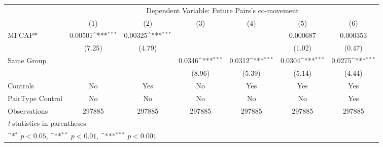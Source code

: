 {
\def\sym#1{\ifmmode^{#1}\else\(^{#1}\)\fi}
\begin{tabular}{l*{6}{c}}
\hline\hline
                &\multicolumn{6}{c}{Dependent Variable:  Future Pairs's co-movement}                                              \\\cmidrule(lr){2-7}
                &\multicolumn{1}{c}{(1)}         &\multicolumn{1}{c}{(2)}         &\multicolumn{1}{c}{(3)}         &\multicolumn{1}{c}{(4)}         &\multicolumn{1}{c}{(5)}         &\multicolumn{1}{c}{(6)}         \\
\hline
$ \text{MFCAP*} $&  0.00501\sym{***}&  0.00325\sym{***}&                  &                  & 0.000687         & 0.000353         \\
                &   (7.25)         &   (4.79)         &                  &                  &   (1.02)         &   (0.47)         \\
[1em]
Same Group      &                  &                  &   0.0346\sym{***}&   0.0312\sym{***}&   0.0304\sym{***}&   0.0275\sym{***}\\
                &                  &                  &   (8.96)         &   (5.39)         &   (5.14)         &   (4.44)         \\
\hline
Controls        &       No         &      Yes         &       No         &      Yes         &      Yes         &      Yes         \\
PairType Control&       No         &       No         &       No         &       No         &       No         &      Yes         \\
Observations    &   297885         &   297885         &   297885         &   297885         &   297885         &   297885         \\
\hline\hline
\multicolumn{7}{l}{\footnotesize \textit{t} statistics in parentheses}\\
\multicolumn{7}{l}{\footnotesize \sym{*} \(p<0.05\), \sym{**} \(p<0.01\), \sym{***} \(p<0.001\)}\\
\end{tabular}
}
